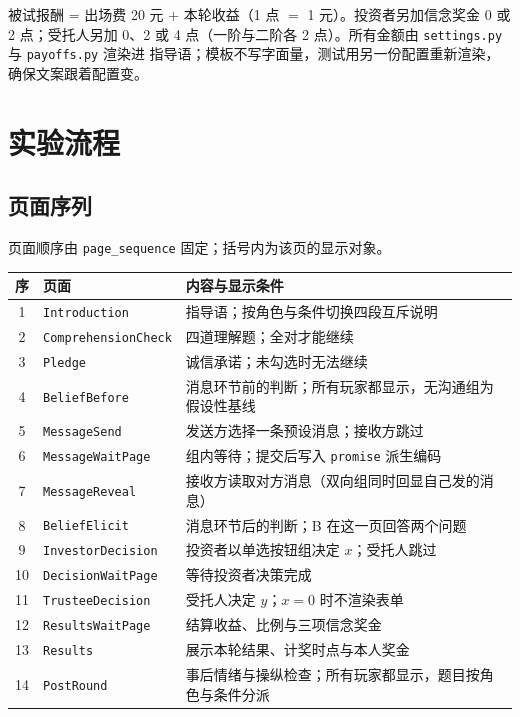 \documentclass[10pt,a4paper]{ctexart}
\newcommand{\code}[1]{\texttt{#1}}
\begin{document}
被试报酬 = 出场费 20 元 + 本轮收益（1 点 $=$ 1 元）。投资者另加信念奖金 0 或 2 点；受托人另加
0、2 或 4 点（一阶与二阶各 2 点）。所有金额由 \code{settings.py} 与 \code{payoffs.py} 渲染进
指导语；模板不写字面量，测试用另一份配置重新渲染，确保文案跟着配置变。

\section{实验流程}

\subsection{页面序列}

页面顺序由 \code{page\_sequence} 固定；括号内为该页的显示对象。

\begin{table}[h]
\centering\small
\begin{tabular}{clp{7.0cm}}
\toprule
序 & 页面 & 内容与显示条件 \\
\midrule
1 & \code{Introduction} & 指导语；按角色与条件切换四段互斥说明 \\
2 & \code{ComprehensionCheck} & 四道理解题；全对才能继续 \\
3 & \code{Pledge} & 诚信承诺；未勾选时无法继续 \\
4 & \code{BeliefBefore} & 消息环节前的判断；所有玩家都显示，无沟通组为假设性基线 \\
5 & \code{MessageSend} & 发送方选择一条预设消息；接收方跳过 \\
6 & \code{MessageWaitPage} & 组内等待；提交后写入 \code{promise} 派生编码 \\
7 & \code{MessageReveal} & 接收方读取对方消息（双向组同时回显自己发的消息） \\
8 & \code{BeliefElicit} & 消息环节后的判断；B 在这一页回答两个问题 \\
9 & \code{InvestorDecision} & 投资者以单选按钮组决定 $x$；受托人跳过 \\
10 & \code{DecisionWaitPage} & 等待投资者决策完成 \\
11 & \code{TrusteeDecision} & 受托人决定 $y$；$x=0$ 时不渲染表单 \\
12 & \code{ResultsWaitPage} & 结算收益、比例与三项信念奖金 \\
13 & \code{Results} & 展示本轮结果、计奖时点与本人奖金 \\
14 & \code{PostRound} & 事后情绪与操纵检查；所有玩家都显示，题目按角色与条件分派 \\
\bottomrule
\end{tabular}
\end{table}
\end{document}
